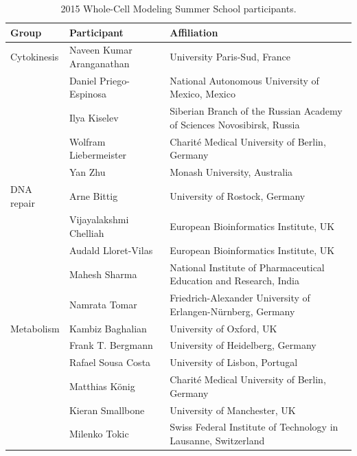 \documentclass[journal,transmag]{IEEEtran}
\begin{document}
\begin{table}[ht!]
\caption{2015 Whole-Cell Modeling Summer School participants.}
\begin{tabularx}{\textwidth}{llX}
\toprule
\textbf{Group}           & \textbf{Participant}            & \textbf{Affiliation}\\
\midrule
Cytokinesis               & Naveen Kumar Aranganathan        & University Paris-Sud, France\\
                          & Daniel Priego-Espinosa           & National Autonomous University of Mexico, Mexico\\
                          & Ilya Kiselev                     & Siberian Branch of the Russian Academy of Sciences Novosibirsk, Russia\\
                          & Wolfram Liebermeister            & Charit\'e Medical University of Berlin, Germany\\
                          & Yan Zhu                          & Monash University, Australia\\
\midrule
DNA repair                & Arne Bittig                      & University of Rostock, Germany\\
                          & Vijayalakshmi Chelliah           & European Bioinformatics Institute, UK\\
                          & Audald Lloret-Vilas              & European Bioinformatics Institute, UK\\
                          & Mahesh Sharma                    & National Institute of Pharmaceutical Education and Research, India\\
                          & Namrata Tomar                    & Friedrich-Alexander University of Erlangen-N\"urnberg, Germany\\
\midrule
Metabolism                & Kambiz Baghalian                 & University of Oxford, UK\\
                          & Frank T. Bergmann                & University of Heidelberg, Germany\\
                          & Rafael Sousa Costa               & University of Lisbon, Portugal\\
                          & Matthias K\"onig                 & Charit\'e Medical University of Berlin, Germany\\
                          & Kieran Smallbone                 & University of Manchester, UK\\
                          & Milenko Tokic                    & Swiss Federal Institute of Technology in Lausanne, Switzerland\\

\end{tabularx}
\end{table}
\end{document}
